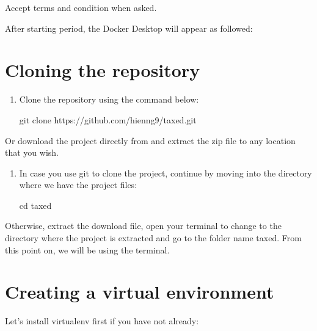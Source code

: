 \documentclass[letterpaper,10pt,english]{sphinxmanual}
\begin{document}
\sphinxAtStartPar
Accept terms and condition when asked.

\noindent{}

\sphinxAtStartPar
After starting period, the Docker Desktop will appear as followed:

\noindent{}


\section{Cloning the repository}
\label{\detokenize{pages/installation-testing:cloning-the-repository}}\begin{enumerate}
%
\item {} 
\sphinxAtStartPar
Clone the repository using the command below:

\begin{sphinxVerbatim}[commandchars=\\\{\}]
\PYGZdl{} git clone https://github.com/hienng9/taxed.git
\end{sphinxVerbatim}

\end{enumerate}

\sphinxAtStartPar
Or download the project directly from  and extract the zip file to any location that you wish.

\noindent{}
\begin{enumerate}
%
\setcounter{enumi}{1}
\item {} 
\sphinxAtStartPar
In case you use git to clone the project, continue by moving into the directory where we have the project files:

\begin{sphinxVerbatim}[commandchars=\\\{\}]
\PYGZdl{} cd taxed
\end{sphinxVerbatim}

\end{enumerate}

\sphinxAtStartPar
Otherwise, extract the download file, open your terminal to change to the directory where the project is extracted and go to the folder name taxed.
From this point on, we will be using the terminal.


\section{Creating a virtual environment}
\label{\detokenize{pages/installation-testing:creating-a-virtual-environment}}
\sphinxAtStartPar
Let’s install virtualenv first if you have not already:
\end{document}
